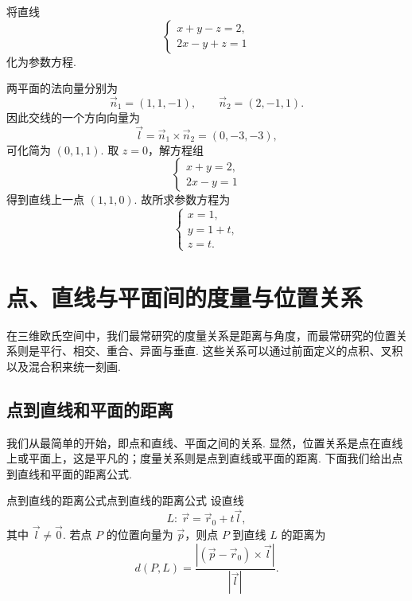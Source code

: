 \begin{example}{}{}
    将直线
    \[
        \begin{cases}
            x + y - z = 2, \\
            2x - y + z = 1
        \end{cases}
    \]
    化为参数方程.
\end{example}

\begin{solution}
    两平面的法向量分别为
    \[
        \vec{n}_1 = (1, 1, -1), \qquad \vec{n}_2 = (2, -1, 1).
    \]
    因此交线的一个方向向量为
    \[
        \vec{l} = \vec{n}_1 \times \vec{n}_2 = (0, -3, -3),
    \]
    可化简为 $(0, 1, 1)$. 取 $z = 0$，解方程组
    \[
        \begin{cases}
            x + y = 2, \\
            2x - y = 1
        \end{cases}
    \]
    得到直线上一点 $(1, 1, 0)$. 故所求参数方程为
    \[
        \begin{cases}
            x = 1, \\
            y = 1 + t, \\
            z = t.
        \end{cases}
    \]
\end{solution}

\section{点、直线与平面间的度量与位置关系}

在三维欧氏空间中，我们最常研究的度量关系是距离与角度，而最常研究的位置关系则是平行、相交、重合、异面与垂直. 这些关系可以通过前面定义的点积、叉积以及混合积来统一刻画.

\subsection{点到直线和平面的距离}

我们从最简单的开始，即点和直线、平面之间的关系. 显然，位置关系是点在直线上或平面上，这是平凡的；度量关系则是点到直线或平面的距离. 下面我们给出点到直线和平面的距离公式.

\begin{theorem}{点到直线的距离公式}{点到直线的距离公式}
    设直线
    \[
        L:\ \vec{r} = \vec{r}_0 + t \vec{l},
    \]
    其中 $\vec{l} \neq \vec{0}$. 若点 $P$ 的位置向量为 $\vec{p}$，则点 $P$ 到直线 $L$ 的距离为
    \[
        d(P, L) = \frac{|(\vec{p} - \vec{r}_0)\times \vec{l}|}{|\vec{l}|}.
    \]
\end{theorem}

